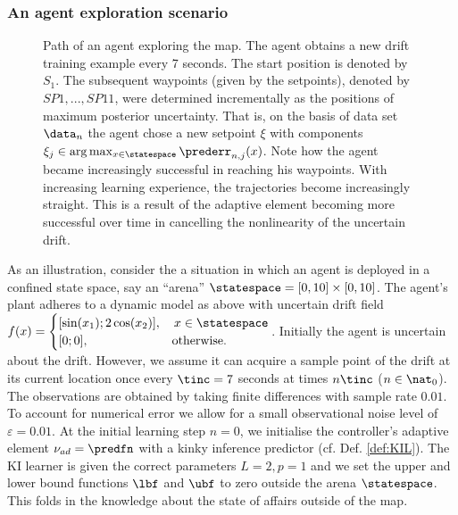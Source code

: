 \subsubsection{An agent exploration scenario} 
\label{sec:agentexploration}
\begin{figure}\label{fig:explorsingleint}
        \centering
       \caption{Path of an agent exploring the map. The agent obtains a new drift training example every 7 seconds. The start position is denoted by $S_1$. The subsequent waypoints (given by the setpoints), denoted by $SP1,...,SP11$, were determined incrementally as the positions of maximum posterior uncertainty. That is, on the basis of data set $\data_n$ the agent chose a new setpoint $\xi$ with components $\xi_j \in \arg\max_{x \in \statespace} \prederr_{n,j}(x)$. Note how the agent became increasingly successful in reaching his waypoints. With increasing learning experience, the trajectories become increasingly straight. This is a result of the adaptive element becoming more successful over time in cancelling the nonlinearity of the uncertain drift.} 
\end{figure}	  
%
%
As an illustration, consider the a situation in which an agent is deployed in a confined state space, say an ``arena'' $\statespace = [0, 10] \times  [0,10]$. The agent's plant adheres to a dynamic model as above with uncertain drift field $f(x) = \begin{cases}  [\sin(x_1); 2 \cos(x_2)], &\,  x \in \statespace\\ [0;0], &\text{otherwise}. \end{cases} $. Initially the agent is uncertain about the drift. However, we assume it can acquire a sample point of the drift at its current location once every $\tinc =7$ seconds at times $n\tinc$ ($n \in \nat_0$). The observations are obtained by taking finite differences with sample rate $0.01$. To account for numerical error we allow for a small observational noise level of $\varepsilon =0.01$.  At the initial learning step $n=0$, we initialise the controller's adaptive element $\nu_{ad} = \predfn$ with a kinky inference predictor (cf. Def. \ref{def:KIL}). The KI learner is given the correct parameters $L=2,p=1$ and we set the upper and lower bound functions $\lbf$ and $\ubf$ to zero outside the arena $\statespace$. This folds in the knowledge about the state of affairs outside of the map. 
